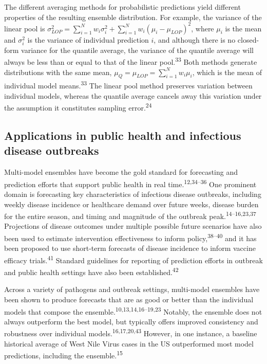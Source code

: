 \documentclass[
]{article}
\begin{document}
The different averaging methods for probabilistic predictions yield
different properties of the resulting ensemble distribution. For
example, the variance of the linear pool is
\(\sigma^2_{LOP} = \sum_{i=1}^Nw_i\sigma_i^2 + \sum_{i=1}^Nw_i(\mu_i-\mu_{LOP})^2\),
where \(\mu_i\) is the mean and \(\sigma^2_i\) is the variance of
individual prediction \(i\), and although there is no closed-form
variance for the quantile average, the variance of the quantile average
will always be less than or equal to that of the linear
pool.\textsuperscript{33} Both methods generate distributions with the
same mean, \(\mu_Q = \mu_{LOP} = \sum_{i=1}^Nw_i\mu_i\), which is the
mean of individual model means.\textsuperscript{33} The linear pool
method preserves variation between individual models, whereas the
quantile average cancels away this variation under the assumption it
constitutes sampling error.\textsuperscript{24}

\subsection{Applications in public health and infectious disease
outbreaks}\label{applications-in-public-health-and-infectious-disease-outbreaks}

Multi-model ensembles have become the gold standard for forecasting and
prediction efforts that support public health in real
time.\textsuperscript{12,34--36} One prominent domain is forecasting key
characteristics of infectious disease outbreaks, including weekly
disease incidence or healthcare demand over future weeks, disease burden
for the entire season, and timing and magnitude of the outbreak
peak.\textsuperscript{14--16,23,37} Projections of disease outcomes
under multiple possible future scenarios have also been used to estimate
intervention effectiveness to inform policy,\textsuperscript{38--40} and
it has been proposed to use short-term forecasts of disease incidence to
inform vaccine efficacy trials.\textsuperscript{41} Standard guidelines
for reporting of prediction efforts in outbreak and public health
settings have also been established.\textsuperscript{42}

Across a variety of pathogens and outbreak settings, multi-model
ensembles have been shown to produce forecasts that are as good or
better than the individual models that compose the
ensemble.\textsuperscript{10,13,14,16--19,23} Notably, the ensemble does
not always outperform the best model, but typically offers improved
consistency and robustness over individual
models.\textsuperscript{16,17,20,43} However, in one instance, a
baseline historical average of West Nile Virus cases in the US
outperformed most model predictions, including the
ensemble.\textsuperscript{15}
\end{document}
